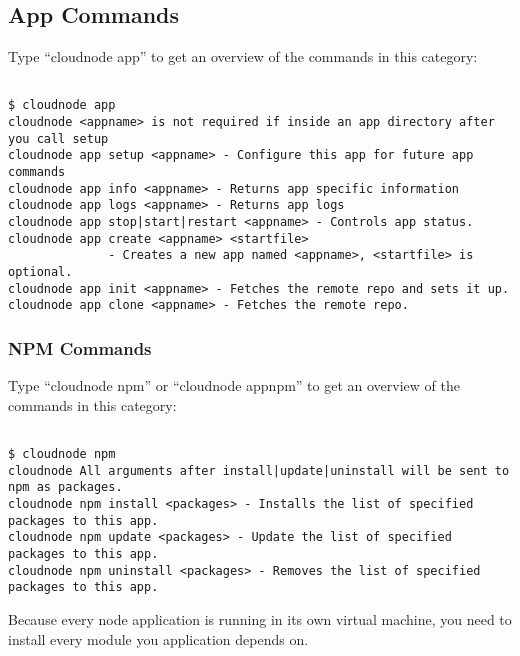 \subsection{App Commands}
\label{appcommands}

Type ``cloudnode app'' to get an overview of the commands in this category:

\begin{adjustwidth}{2.5em}{2.5em}
\begin{verbatim}

$ cloudnode app
cloudnode <appname> is not required if inside an app directory after you call setup
cloudnode app setup <appname> - Configure this app for future app commands
cloudnode app info <appname> - Returns app specific information
cloudnode app logs <appname> - Returns app logs
cloudnode app stop|start|restart <appname> - Controls app status.
cloudnode app create <appname> <startfile> 
              - Creates a new app named <appname>, <startfile> is optional.
cloudnode app init <appname> - Fetches the remote repo and sets it up.
cloudnode app clone <appname> - Fetches the remote repo.

\end{verbatim}
\end{adjustwidth}

\subsubsection{NPM Commands}
\label{npmcommands}

Type ``cloudnode npm'' or ``cloudnode appnpm'' to get an overview of the commands in this category:

\begin{adjustwidth}{2.5em}{2.5em}
\begin{verbatim}

$ cloudnode npm
cloudnode All arguments after install|update|uninstall will be sent to npm as packages.
cloudnode npm install <packages> - Installs the list of specified packages to this app.
cloudnode npm update <packages> - Update the list of specified packages to this app.
cloudnode npm uninstall <packages> - Removes the list of specified packages to this app.

\end{verbatim}
\end{adjustwidth}

Because every node application is running in its own virtual machine, you need to install every module you application depends on.

